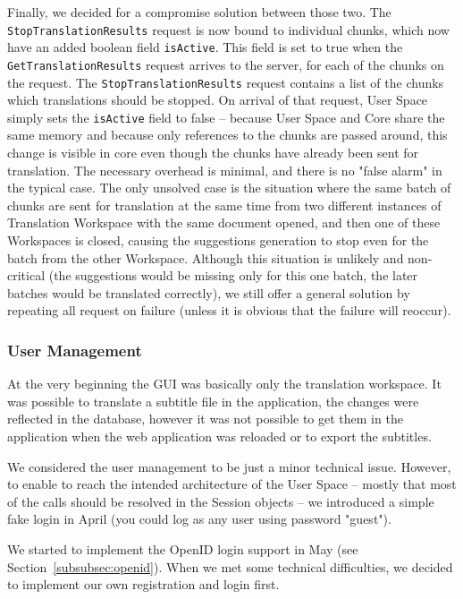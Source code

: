 Finally, we decided for a compromise solution between those two. The {\tt StopTranslationResults} request is now bound to individual chunks, which now have an added boolean field {\tt isActive}. This field is set to true when the {\tt GetTranslationResults} request arrives to the server, for each of the chunks on the request. The {\tt StopTranslationResults} request contains a list of the chunks which translations should be stopped. On arrival of that request, User Space simply sets the {\tt isActive} field to false -- because User Space and Core share the same memory and because only references to the chunks are passed around, this change is visible in core even though the chunks have already been sent for translation. The necessary overhead is minimal, and there is no "false alarm" in the typical case. The only unsolved case is the situation where the same batch of chunks are sent for translation at the same time from two different instances of Translation Workspace with the same document opened, and then one of these Workspaces is closed, causing the suggestions generation to stop even for the batch from the other Workspace. Although this situation is unlikely and non-critical (the suggestions would be missing only for this one batch, the later batches would be translated correctly), we still offer a general solution by repeating all request on failure (unless it is obvious that the failure will reoccur).

\subsubsection{User Management}

At the very beginning the GUI was basically only the translation workspace. It was possible to translate a subtitle file in the application, the changes were reflected in the database, however it was not possible to get them in the application when the web application was reloaded or to export the subtitles.

We considered the user management to be just a minor technical issue. However, to enable to reach the intended architecture of the User Space -- mostly that most of the calls should be resolved in the Session objects -- we introduced a simple fake login in April (you could log as any user using password "guest").

We started to implement the OpenID login support in May (see Section~\ref{subsubsec:openid}). When we met some technical difficulties, we decided to implement our own registration and login first.

